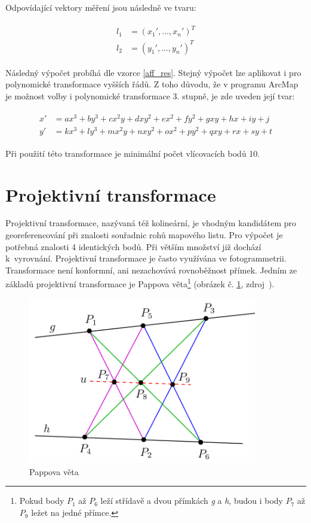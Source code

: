 \documentclass[thesis=M,czech]{FITthesis}[2012/06/26]
\begin{document}
Odpovídající vektory měření jsou následně ve tvaru:

\begin{align} \label{poly2_l12}
\begin{split}
l_1 &= (x_1', \ldots , x_n')^T  \\
l_2 &= ( y_1', \ldots , y_n')^T
\end{split}
\end{align}

Následný výpočet probíhá dle vzorce \eqref{aff_res}. Stejný výpočet lze aplikovat i pro polynomické transformace vyšších řádů. Z toho důvodu, že v programu ArcMap je možnost volby i polynomické transformace 3. stupně, je zde uveden její tvar:


\begin{align} \label{poly_3}
\begin{split}
x' &= ax^3 + by^3 + cx^2y + dxy^2 + ex^2 + fy^2 + gxy + hx + iy + j \\
y' &= kx^3 + ly^3 + mx^2y + nxy^2 + ox^2 + py^2 + qxy + rx + sy + t  
\end{split}
\end{align}

Při použití této transformace je minimální počet vlícovacích bodů 10. 



\section{Projektivní transformace}
Projektivní transformace, nazývaná též kolineární, je vhodným kandidátem pro georeferencování při znalosti souřadnic rohů mapového listu. Pro výpočet je potřebná znalosti 4 identických bodů. Při větším množství již dochází k~vyrovnání. Projektivní transformace je často využívána ve fotogrammetrii. Transformace není konformní, ani nezachovává rovnoběžnost přímek. Jedním ze základů projektivní transformace je Pappova věta\footnote{Pokud body $P_1$ až $P_6$ leží střídavě a dvou přímkách \textit{g} a \textit{h}, budou i body $P_7$ až $P_9$ ležet na jedné přímce.} (obrázek č. \ref{obrazek:pap}, zdroj~\cite{pappova}).
\newpage

\begin{figure}[h!]
	\centering
	\includegraphics[width=10cm]{pics/papova_veta.png}
	\caption{Pappova věta}
	\label{obrazek:pap}
\end{figure}
\end{document}
